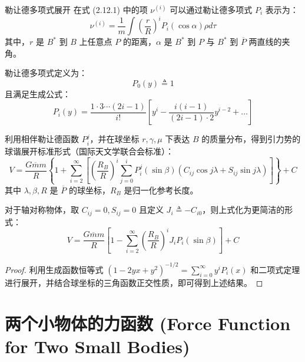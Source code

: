 \begin{myTheorem}{勒让德多项式展开}
在式 (2.12.1) 中的项 \(\nu^{(i)}\) 可以通过勒让德多项式 \(P_i\) 表示为：
\begin{equation}
\nu^{(i)} = \frac{1}{m}\int \left(\frac{r}{R}\right)^i P_i(\cos\alpha)\rho d\tau \tag{1}
\end{equation}
其中，\(r\) 是 \(B^*\) 到 \(B\) 上任意点 \(P\) 的距离，\(\alpha\) 是 \(B^*\) 到 \(P\) 与 \(B^*\) 到 \(\overline{P}\) 两直线的夹角。
\end{myTheorem}

勒让德多项式定义为：
\begin{equation}
P_0(y) \triangleq 1 \tag{2}
\end{equation}
且满足生成公式：
\begin{equation}
P_i(y) = \frac{1 \cdot 3 \cdots (2i-1)}{i!}\left[ y^i - \frac{i(i-1)}{(2i-1)\cdot 2}y^{i-2} + \dots \right] \tag{3}
\end{equation}

利用相伴勒让德函数 \(P_i^j\)，并在球坐标 \(r,\gamma,\mu\) 下表达 \(B\) 的质量分布，得到引力势的球谐展开标准形式（国际天文学联合会标准）：
\begin{equation}
V = \frac{G\overline{m}m}{R}\left\{1 + \sum_{i=2}^{\infty}\left[\left(\frac{R_B}{R}\right)^i\sum_{j=0}^i P_i^j(\sin\beta)(C_{ij}\cos j\lambda + S_{ij}\sin j\lambda)\right]\right\} + C \tag{12}
\end{equation}
其中 \(\lambda,\beta,R\) 是 \(\overline{P}\) 的球坐标，\(R_B\) 是归一化参考长度。

对于轴对称物体，取 \(C_{ij}=0, S_{ij}=0\) 且定义 \(J_i \triangleq -C_{i0}\)，则上式化为更简洁的形式：
\begin{equation}
V = \frac{G\overline{m}m}{R}\left[1 - \sum_{i=2}^{\infty}\left(\frac{R_B}{R}\right)^i J_i P_i(\sin\beta)\right] + C \tag{14}
\end{equation}
\begin{proof}
利用生成函数恒等式 \((1 - 2yx + y^2)^{-1/2} = \sum_{i=0}^{\infty} y^i P_i(x)\) 和二项式定理进行展开，并结合球坐标的三角函数正交性质，即可得到上述结果。
\end{proof}

\section{两个小物体的力函数 (Force Function for Two Small Bodies)}

